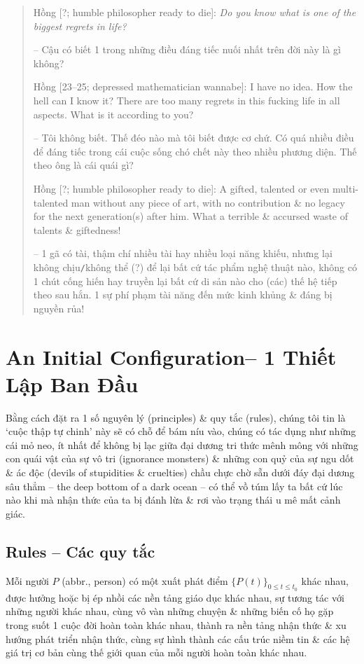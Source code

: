 \documentclass[12pt]{article}
\begin{document}
\begin{quotation}
	{\sf Hồng [?; humble philosopher ready to die]}: {\it Do you know what is one of the biggest regrets in life?}
	
	-- Cậu có biết 1 trong những điều đáng tiếc nuối nhất trên đời này là gì không?
	
	{\sf Hồng [23--25; depressed mathematician wannabe]}: I have no idea. How the hell can I know it? There are too many regrets in this fucking life in all aspects. What is it according to you?
	
	-- Tôi không biết. Thế đéo nào mà tôi biết được cơ chứ. Có quá nhiều điều để đáng tiếc trong cái cuộc sống chó chết này theo nhiều phương diện. Thế theo ông là cái quái gì?
	
	{\sf Hồng [?; humble philosopher ready to die]}: A gifted, talented or even multi-talented man without any piece of art, with no contribution \& no legacy for the next generation(s) after him. What a terrible \& accursed waste of talents \& giftedness!
	
	-- 1 gã có tài, thậm chí nhiều tài hay nhiều loại năng khiếu, nhưng lại không chịu{\tt/}không thể (?) để lại bất cứ tác phẩm nghệ thuật nào, không có 1 chút cống hiến hay truyền lại bất cứ di sản nào cho (các) thế hệ tiếp theo sau hắn. 1 sự phí phạm tài năng đến mức kinh khủng \& đáng bị nguyền rủa!
\end{quotation}

\section{An Initial Configuration-- 1 Thiết Lập Ban Đầu}
Bằng cách đặt ra 1 số nguyên lý (principles) \& quy tắc (rules), chúng tôi tin là `cuộc thập tự chinh' này sẽ có chỗ để bám níu vào, chúng có tác dụng như những cái mỏ neo, ít nhất để không bị lạc giữa đại dương tri thức mênh mông với những con quái vật của sự vô tri (ignorance monsters) \& những con quỷ của sự ngu dốt \& ác độc (devils of stupidities \& cruelties) chầu chực chờ sẵn dưới đáy đại dương sâu thẳm -- the deep bottom of a dark ocean -- có thể vồ túm lấy ta bất cứ lúc nào khi mà nhận thức của ta bị đánh lừa \& rơi vào trạng thái u mê mất cảnh giác.

\subsection{Rules -- Các quy tắc}
Mỗi người $P$ (abbr., person) có một xuất phát điểm $\{P(t)\}_{0\le t\le t_0}$ khác nhau, được hưởng hoặc bị ép nhồi các nền tảng giáo dục khác nhau, sự tương tác với những người khác nhau, cùng vô vàn những chuyện \& những biến cố họ gặp trong suốt 1 cuộc đời hoàn toàn khác nhau, thành ra nền tảng nhận thức \& xu hướng phát triển nhận thức, cùng sự hình thành các cấu trúc niềm tin \& các hệ giá trị cơ bản cùng thế giới quan của mỗi người hoàn toàn khác nhau.
\end{document}
